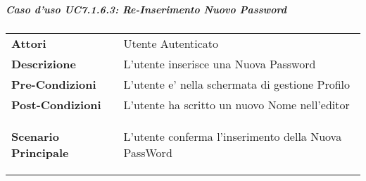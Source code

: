\subparagraph{Caso d'uso UC7.1.6.3:  Re-Inserimento Nuovo Password}
\label{UC7_1_6_3}

\begin{tabular}{ l | p{11cm}}
	\hline
	\rowcolor{Gray}
	 \multicolumn{2}{c}{UC7.1.6.3 - Re-Inserimento Nuova Password} \\
	 \hline
	\textbf{Attori} & Utente Autenticato \\
	\textbf{Descrizione} & L'utente inserisce una Nuova Password\\
	\textbf{Pre-Condizioni} & L'utente e' nella schermata di gestione Profilo\\
	\textbf{Post-Condizioni} & L'utente ha scritto un nuovo Nome nell'editor\\
	\textbf{Scenario Principale} & 
	\begin{enumerate*}[label=(\arabic*.),itemjoin={\newline}]
		\item L'utente conferma l'inserimento della Nuova PassWord
	\end{enumerate*}\\
\end{tabular}